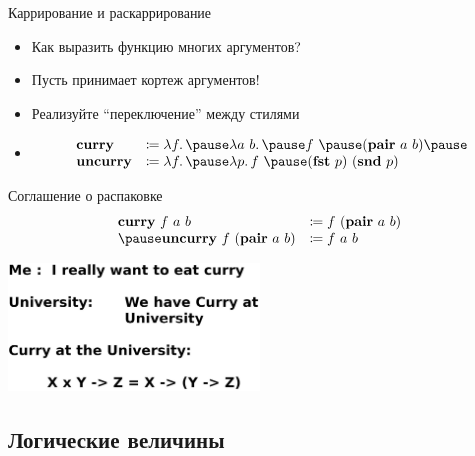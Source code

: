     \begin{frame}{Каррирование и раскаррирование}
        \begin{itemize}
            \item[\todo] Как выразить функцию многих аргументов?
            \item[\answer] \pause Пусть принимает кортеж аргументов!
            \item[\todo] Реализуйте ``переключение'' между стилями
            \item[\answer] \pause
            \[
                \begin{array}{l l}
                    \term{curry}   & \termdef \lambda f\ldotp \pause \lambda a~b\ldotp \pause f~ \pause (\term{pair}~a~b) \pause \\
                    \term{uncurry} & \termdef \lambda f\ldotp \pause \lambda p\ldotp f~ \pause (\term{fst}~p)~(\term{snd}~p)
                \end{array}
            \]
        \end{itemize}
        \pause
        \begin{block}{Соглашение о распаковке}
            \[
                \begin{array}{l l}
                    \term{curry}~f~a~b                 & \termdef f~(\term{pair}~a~b) \\ \pause
                    \term{uncurry}~f~(\term{pair}~a~b) & \termdef f~a~b
                \end{array}
            \]
        \end{block}
    \end{frame}

    \begin{frame}{}
        \begin{center}
            \vspace{3em}
            \includegraphics[width=0.5\textwidth]{figs/curry}
        \end{center}
    \end{frame}

    \subsection{Логические величины}


